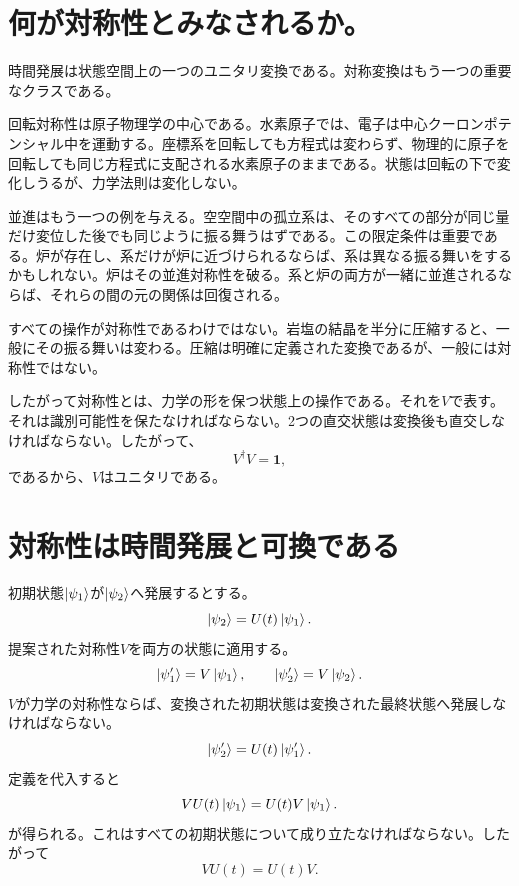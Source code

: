 \begin{classroomqa}
\end{classroomqa}

\section{何が対称性とみなされるか。}

時間発展は状態空間上の一つのユニタリ変換である。対称変換はもう一つの重要なクラスである。

回転対称性は原子物理学の中心である。水素原子では、電子は中心クーロンポテンシャル中を運動する。座標系を回転しても方程式は変わらず、物理的に原子を回転しても同じ方程式に支配される水素原子のままである。状態は回転の下で変化しうるが、力学法則は変化しない。

並進はもう一つの例を与える。空空間中の孤立系は、そのすべての部分が同じ量だけ変位した後でも同じように振る舞うはずである。この限定条件は重要である。炉が存在し、系だけが炉に近づけられるならば、系は異なる振る舞いをするかもしれない。炉はその並進対称性を破る。系と炉の両方が一緒に並進されるならば、それらの間の元の関係は回復される。

すべての操作が対称性であるわけではない。岩塩の結晶を半分に圧縮すると、一般にその振る舞いは変わる。圧縮は明確に定義された変換であるが、一般には対称性ではない。

したがって対称性とは、力学の形を保つ状態上の操作である。それを\(V\)で表す。それは識別可能性を保たなければならない。2つの直交状態は変換後も直交しなければならない。したがって、
\begin{equation}
V^\dagger V=\mathbf 1,
\end{equation}
であるから、\(V\)はユニタリである。

\section{対称性は時間発展と可換である}

初期状態\(\left\lvert\psi_1\right\rangle\)が\(\left\lvert\psi_2\right\rangle\)へ発展するとする。
\begin{equation}
\left\lvert\psi_2\right\rangle=U(t)\left\lvert\psi_1\right\rangle.
\end{equation}
提案された対称性\(V\)を両方の状態に適用する。
\begin{equation}
\left\lvert\psi_1'\right\rangle=V\left\lvert\psi_1\right\rangle,
\qquad
\left\lvert\psi_2'\right\rangle=V\left\lvert\psi_2\right\rangle.
\end{equation}
\(V\)が力学の対称性ならば、変換された初期状態は変換された最終状態へ発展しなければならない。
\begin{equation}
\left\lvert\psi_2'\right\rangle=U(t)\left\lvert\psi_1'\right\rangle.
\end{equation}
定義を代入すると
\begin{equation}
VU(t)\left\lvert\psi_1\right\rangle
=
U(t)V\left\lvert\psi_1\right\rangle.
\end{equation}
が得られる。これはすべての初期状態について成り立たなければならない。したがって
\begin{equation}
VU(t)=U(t)V.
\end{equation}

